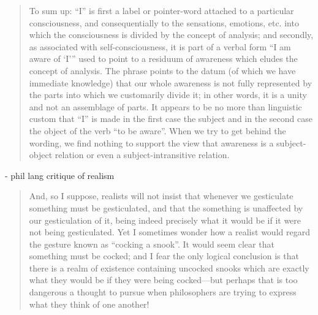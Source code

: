 \begin{quote}
    To sum up: ``I'' is first a label or pointer-word attached to a particular consciousness, and consequentially to the sensations, emotions, etc. into which the consciousness is divided by the concept of analysis; and secondly, as associated with self-consciousness, it is part of a verbal form ``I am aware of `I''' used to point to a residuum of awareness which eludes the concept of analysis.  The phrase points to the datum (of which we have immediate knowledge) that our whole awareness is not fully represented by the parts into which we customarily divide it; in other words, it is a unity and not an assemblage of parts.  It appears to be no more than linguistic custom that ``I'' is made in the first case the subject and in the second case the object of the verb ``to be aware''.  When we try to get behind the wording, we find nothing to support the view that awareness is a subject-object relation or even a subject-intransitive relation.  \citep[p. 206-207]{Eddington1939}
\end{quote}

- phil lang critique of realism

\begin{quote}
    And, so I suppose, realists will not insist that whenever we gesticulate something must be gesticulated, and that the something is unaffected by our gesticulation of it, being indeed precisely what it would be if it were not being gesticulated.  Yet I sometimes wonder how a realist would regard the gesture known as ``cocking a snook''.  It would seem clear that something must be cocked; and I fear the only logical conclusion is that there is a realm of existence containing uncocked snooks which are exactly what they would be if they were being cocked---but perhaps that is too dangerous a thought to pursue when philosophers are trying to express what they think of one another!  \citep[p. 213-214]{Eddington1939}
\end{quote}


